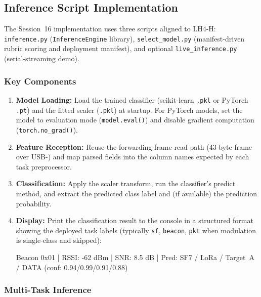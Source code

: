 \documentclass[11pt,letterpaper]{article}
\begin{document}
	\subsection{Inference Script Implementation}

	The Session~16 implementation uses three scripts aligned to LH4-H: \texttt{inference.py} (\texttt{InferenceEngine} library), \texttt{select\_model.py} (manifest-driven rubric scoring and deployment manifest), and optional \texttt{live\_inference.py} (serial-streaming demo).

	\subsubsection{Key Components}

	\begin{enumerate}[leftmargin=2em]
		\item \textbf{Model Loading:} Load the trained classifier (scikit-learn \texttt{.pkl} or PyTorch \texttt{.pt}) and the fitted scaler (\texttt{.pkl}) at startup. For PyTorch models, set the model to evaluation mode (\texttt{model.eval()}) and disable gradient computation (\texttt{torch.no\_grad()}).

		\item \textbf{Feature Reception:} Reuse the forwarding-frame read path (43-byte frame over USB-\UART{}) and map parsed fields into the column names expected by each task preprocessor.

		\item \textbf{Classification:} Apply the scaler transform, run the classifier's predict method, and extract the predicted class label and (if available) the prediction probability.

		\item \textbf{Display:} Print the classification result to the console in a structured format showing the deployed task labels (typically \texttt{sf}, \texttt{beacon}, \texttt{pkt} when modulation is single-class and skipped):
		\begin{center}
			\small\ttfamily
			[12:34:56.789] Beacon 0x01 | RSSI: -62 dBm | SNR: 8.5 dB | Pred: SF7 / LoRa / Target~A / DATA (conf: 0.94/0.99/0.91/0.88)
		\end{center}
	\end{enumerate}

	\subsubsection{Multi-Task Inference}
\end{document}
